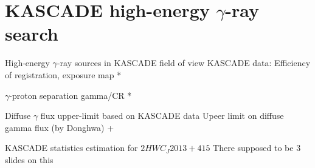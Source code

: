 
\section{KASCADE high-energy \texorpdfstring{$\gamma$}{gamma}-ray search}

\begin{frame}{High-energy $\gamma$-ray sources in KASCADE field of view}
  KASCADE data: Efficiency of registration, exposure map *
\end{frame}

\begin{frame}{$\gamma$-proton separation}
 gamma/CR *
\end{frame}

\begin{frame}{Diffuse $\gamma$ flux upper-limit based on KASCADE data}
  Upeer limit on diffuse gamma flux (by Donghwa) +
\end{frame}

\begin{frame}{KASCADE statistics estimation for $2HWC_J2013+415$}
There supposed to be 3 slides on this
\end{frame}
